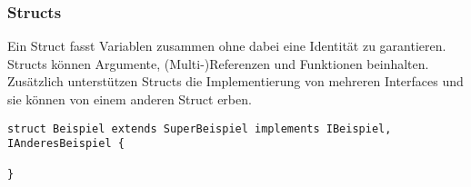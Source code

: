 \documentclass[./einleitung.tex]{subfiles}
\begin{document}
\subsubsection{Structs} Ein Struct fasst Variablen zusammen ohne dabei eine Identität zu garantieren. Structs können Argumente, (Multi-)Referenzen und Funktionen beinhalten.
Zusätzlich unterstützen Structs die Implementierung von mehreren Interfaces und sie können von einem anderen Struct erben.
\begin{lstlisting}
struct Beispiel extends SuperBeispiel implements IBeispiel, IAnderesBeispiel {

}
\end{lstlisting}




\end{document}
